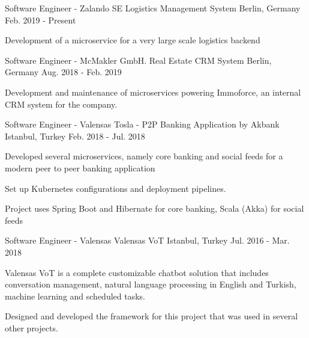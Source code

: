 

\begin{cventries}

  \cventry
    {Software Engineer - Zalando SE}
    {Logistics Management System}
    {Berlin, Germany}
    {Feb. 2019 - Present}
    {
      \begin{cvitems}
        \item {Development of a microservice for a very large scale logistics backend}
      \end{cvitems}
    } 


  \cventry
    {Software Engineer - McMakler GmbH.}
    {Real Estate CRM System}
    {Berlin, Germany}
    {Aug. 2018 - Feb. 2019}
    {
      \begin{cvitems}
        \item {Development and maintenance of microservices powering Immoforce, an internal CRM system for the company.}
      \end{cvitems}
    } 

  \cventry
    {Software Engineer - Valensas}
    {Tosla - P2P Banking Application by Akbank}
    {Istanbul, Turkey}
    {Feb. 2018 - Jul. 2018}
    {
      \begin{cvitems}
        \item {Developed several microservices, namely core banking and social feeds for a modern peer to peer banking application}
        \item {Set up Kubernetes configurations and deployment pipelines.}
        \item {Project uses Spring Boot and Hibernate for core banking, Scala (Akka) for social feeds}
      \end{cvitems}
    } 

  \cventry
    {Software Engineer - Valensas}
    {Valensas VoT}
    {Istanbul, Turkey}
    {Jul. 2016 - Mar. 2018}
    {
      \begin{cvitems}
        \item {Valensas VoT is a complete customizable chatbot solution that includes conversation management, natural language processing in English and Turkish, machine learning and scheduled tasks.}
        \item {Designed and developed the framework for this project that was used in several other projects.}
      \end{cvitems}
    }   
    

\end{cventries}
